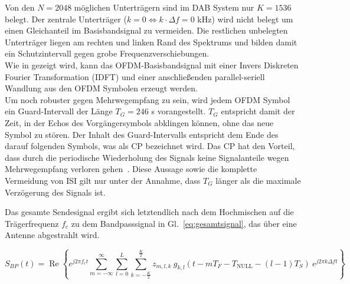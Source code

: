 Von den $N=2048$ möglichen Unterträgern sind im DAB System nur $K = 1536$ belegt. Der zentrale Unterträger ($k=0 \Leftrightarrow k\cdot \Delta f = 0$ kHz) wird nicht belegt um einen Gleichanteil im Basisbandsignal zu vermeiden. Die restlichen unbelegten Unterträger liegen am rechten und linken Rand des Spektrums und bilden damit ein Schutzintervall gegen grobe Frequenzverschiebungen.\\
Wie in \cite{ofdm:idft} gezeigt wird, kann das OFDM-Basisbandsignal mit einer Invers Diskreten Fourier Transformation (IDFT) und einer anschließenden parallel-seriell Wandlung aus den OFDM Symbolen erzeugt werden.\\
Um noch robuster gegen Mehrwegempfang zu sein, wird jedem OFDM Symbol ein Guard-Intervall der Länge $T_G=246$ \textmu s vorangestellt. $T_G$ entspricht damit der Zeit, in der Echos des Vorgängersymbols abklingen können, ohne das neue Symbol zu stören. Der Inhalt des Guard-Intervalls entspricht dem Ende des darauf folgenden Symbols, was als \ac{CP} bezeichnet wird. Das \ac{CP} hat den Vorteil, dass durch die periodische Wiederholung des Signals keine Signalanteile wegen Mehrwegempfang verloren gehen~\cite{nt1}. Diese Aussage sowie die komplette Vermeidung von ISI gilt nur unter der Annahme, dass $T_G$ länger als die maximale Verzögerung des Signals ist.

Das gesamte Sendesignal ergibt sich letztendlich nach dem Hochmischen auf die Trägerfrequenz $f_c$ zu dem Bandpasssignal in Gl.~\ref{eq:gesamtsignal}, das über eine Antenne abgestrahlt wird.

\begin{equation}
S_{BP}(t) = \operatorname{Re} \left\{e^{j2 \pi f_c t} \sum \limits_{m=-\infty}^{\infty} \sum \limits_{l=0}^{L}   \sum \limits_{k=- \frac{K}{2}}^{\frac{K}{2}} z_{m,l,k} \: g_{k,l}(t-mT_F-T_{\text{NULL}}-(l-1)T_S) \: e^{j2\pi k \Delta f t}\right\}
\label{eq:gesamtsignal}
\end{equation}